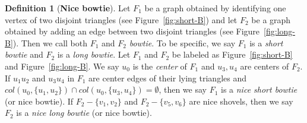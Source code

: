 \documentclass[11pt,a4paper]{article}
\theoremstyle{definition}
\newtheorem{definition}{Definition}
\begin{document}
\begin{definition}[\textbf{Nice bowtie}]
Let $F_1$ be a graph obtained by identifying one vertex of two disjoint triangles (see Figure~\ref{fig:short-B}) and let  $F_2$ be a graph obtained by adding an edge between two disjoint triangles (see Figure~\ref{fig:long-B}). Then we call both $F_1$ and $F_2$ \textit{bowtie}. To be specific, we say $F_1$ is a \textit{short bowtie} and $F_2$ is a \textit{long bowtie}. Let $F_1$ and $F_2$ be labeled as Figure~\ref{fig:short-B} and Figure~\ref{fig:long-B}. We say $u_0$ is the \textit{center} of $F_1$ and $u_3, u_4$ are centers of $F_2$. If $u_1u_2$ and $u_3u_4$ in $F_1$ are center edges of their lying triangles  and $col(u_0, \{u_1,u_2\})\cap col(u_0, \{u_3,u_4\})=\emptyset$, then we say $F_1$ is a \textit{nice short bowtie} (or nice bowtie).  If $F_2-\{v_1,v_2\}$ and $F_2-\{v_5,v_6\}$ are nice shovels, then we say $F_2$ is a \textit{nice long bowtie} (or nice bowtie).
\end{definition}
\end{document}
